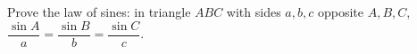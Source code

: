 Prove the law of sines: in triangle $ABC$ with sides $a,b,c$ opposite $A,B,C$, $\dfrac{\sin A}{a}=\dfrac{\sin B}{b}=\dfrac{\sin C}{c}$.
